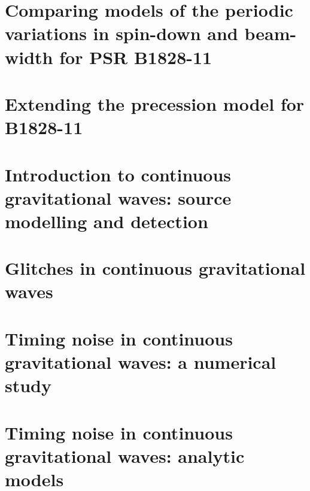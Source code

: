 \documentclass[twoside]{thesis}
\begin{document}
\chapter{Comparing models of the periodic variations in spin-down
and beam-width for PSR B1828-11}
\label{sec: testing models}


\chapter{Extending the precession model for B1828-11}
\label{sec: extending precession models}

\chapter{Introduction to continuous gravitational waves: source modelling and detection}
\label{sec: intro to cgw}


\chapter{Glitches in continuous gravitational waves}
\label{sec: glitches in cgw}


\chapter{Timing noise in continuous gravitational waves: a numerical study}
\label{sec: timing noise in cgw}


\chapter{Timing noise in continuous gravitational waves: analytic models}
\label{sec: timing in cgw analytic}





\end{document}
